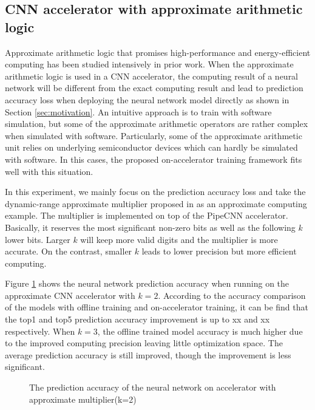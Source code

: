 \subsection{CNN accelerator with approximate arithmetic logic}
Approximate arithmetic logic that promises high-performance and energy-efficient computing has 
been studied intensively in prior work. When the approximate arithmetic logic 
is used in a CNN accelerator, the computing result of a neural network will be different 
from the exact computing result and lead to prediction accuracy loss when deploying 
the neural network model directly as shown in Section \ref{sec:motivation}. 
An intuitive approach is to train with software simulation, but some of the approximate arithmetic 
operators are rather complex when simulated with software. Particularly, some of the 
approximate arithmetic unit relies on underlying semiconductor devices which 
can hardly be simulated with software. In this cases, the proposed on-accelerator 
training framework fits well with this situation. 

In this experiment, we mainly focus on the prediction accuracy loss and 
take the dynamic-range approximate multiplier proposed in \cite{Approximate_Multiplier_31} as 
an approximate computing example. The multiplier is implemented on top of the PipeCNN
accelerator. Basically, it reserves the most significant non-zero bits as well as the 
following $k$ lower bits. Larger $k$ will keep more valid digits and the multiplier 
is more accurate. On the contrast, smaller $k$ leads to lower precision but 
more efficient computing. 

Figure \ref{fig:k2-approximate-multiplier} shows the 
neural network prediction accuracy when running on the approximate CNN 
accelerator with $k=2$. According to the accuracy comparison of the models with 
offline training and on-accelerator training, it can be find that the 
top1 and top5 prediction accuracy improvement is up to xx and xx respectively. 
When $k=3$, the offline trained model accuracy is much higher due to the improved 
computing precision leaving little optimization space. The average prediction 
accuracy is still improved, though the improvement is less significant.
\begin{figure}
        \center
        \qquad
        \caption{The prediction accuracy of the neural network on accelerator with approximate multiplier(k=2)}
        \label{fig:k2-approximate-multiplier}
\end{figure}

